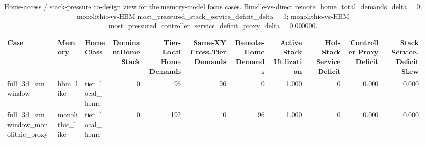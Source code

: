 \begin{table}[t]
  \centering
  \caption{Home-access / stack-pressure co-design view for the memory-model focus cases. Bundle-vs-direct remote\_home\_total\_demands\_delta = 0; monolithic-vs-HBM most\_pressured\_stack\_service\_deficit\_delta = 0; monolithic-vs-HBM most\_pressured\_controller\_service\_deficit\_proxy\_delta = 0.000000.}
  \begin{tabular}{l l l r r r r r r r r}
  \hline
  Case & Memory & HomeClass & DominantHomeStack & Tier-Local Home Demands & Same-XY Cross-Tier Demands & Remote-Home Demands & Active Stack Utilization & Hot-Stack Service Deficit & Controller Proxy Deficit & Stack Service-Deficit Skew \\
  \hline
  full\_3d\_snn\_window & hbm\_like & tier\_local\_home & 0 & 96 & 96 & 0 & 1.000 & 0 & 0.000 & 0.000 \\
  full\_3d\_snn\_window\_monolithic\_proxy & monolithic\_like & tier\_local\_home & 0 & 192 & 0 & 96 & 1.000 & 0 & 0.000 & 0.000 \\
  \hline
  \end{tabular}
\end{table}

